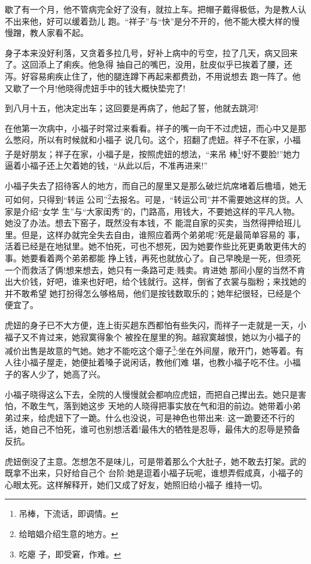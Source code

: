 \documentclass[11pt,a4paper,onecolumn]{article}
\begin{document}
歇了有一个月，他不管病完全好了没有，就拉上车。把帽子戴得极低，为是教人认不出来他，好可以缓着劲儿
跑。``祥子''与``快''是分不开的，他不能大模大样的慢慢蹭，教人家看不起。

身子本来没好利落，又贪着多拉几号，好补上病中的亏空，拉了几天，病又回来了。这回添上了痢疾。他急得
抽自己的嘴巴，没用，肚皮似乎已挨着了腰，还泻。好容易痢疾止住了，他的腿连蹲下再起来都费劲，不用说想去
跑一阵了。他又歇了一个月!他晓得虎妞手中的钱大概快垫完了!

到八月十五，他决定出车；这回要是再病了，他起了誓，他就去跳河!

在他第一次病中，小福子时常过来看看。祥子的嘴一向干不过虎妞，而心中又是那么憋闷，所以有时候就和小福子
说几句。这个，招翻了虎妞。祥子不在家，小福子是好朋友；祥子在家，小福子是，按照虎妞的想法，``来吊
棒\footnote{吊棒，下流话，即调情。}!好不要脸!''她力逼着小福子还上欠着她的钱，``从此以后，不准再进来!''

小福子失去了招待客人的地方，而自己的屋里又是那么破烂\myrule 炕席堵着后檐墙，她无可如何，只得到``转运
公司''\footnote{给暗娼介绍生意的地方。}去报名。可是，``转运公司''并不需要她这样的货。人家是介绍``女学
生''与``大家闺秀''的，门路高，用钱大，不要她这样的平凡人物。她没了办法。想去下窑子，既然没有本钱，不
能混自家的买卖，当然得押给班儿里。但是，这样办就完全失去自由，谁照应着两个弟弟呢?死是最简单容易的
事，活着已经是在地狱里。她不怕死，可也不想死，因为她要作些比死更勇敢更伟大的事。她要看着两个弟弟都能
挣上钱，再死也就放心了。自己早晚是一死，但须死一个而救活了俩!想来想去，她只有一条路可走:贱卖。肯进她
那间小屋的当然不肯出大价钱，好吧，谁来也好吧，给个钱就行。这样，倒省了衣裳与脂粉；来找她的并不敢希望
她打扮得怎么够格局，他们是按钱数取乐的；她年纪很轻，已经是个便宜了。

虎妞的身子已不大方便，连上街买趟东西都怕有些失闪，而祥子一走就是一天，小福子又不肯过来，她寂寞得象个
被拴在屋里的狗。越寂寞越恨，她以为小福子的减价出售是故意的气她。她才不能吃这个瘪子\footnote{吃瘪
  子，即受窘，作难。}:坐在外间屋，敞开门，她等着。有人往小福子屋走，她便扯着嗓子说闲话，教他们难
堪，也教小福子吃不住。小福子的客人少了，她高了兴。

小福子晓得这么下去，全院的人慢慢就会都响应虎妞，而把自己撵出去。她只是害怕，不敢生气，落到她这步
天地的人晓得把事实放在气和泪的前边。她带着小弟弟过来，给虎妞下了一跪。什么也没说，可是神色也带出来:
这一跪要还不行的话，她自己不怕死，谁可也别想活着!最伟大的牺牲是忍辱，最伟大的忍辱是预备反抗。

虎妞倒没了主意。怎想怎不是味儿，可是带着那么个大肚子，她不敢去打架。武的既拿不出来，只好给自己个
台阶:她是逗着小福子玩呢，谁想弄假成真，小福子的心眼太死。这样解释开，她们又成了好友，她照旧给小福子
维持一切。
\end{document}
